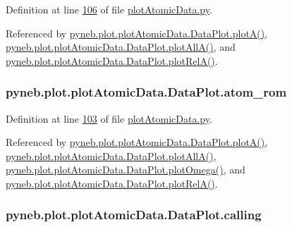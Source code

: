Definition at line \hyperlink{plot_atomic_data_8py_source_l00106}{106} of file \hyperlink{plot_atomic_data_8py_source}{plot\-Atomic\-Data.\-py}.



Referenced by \hyperlink{plot_atomic_data_8py_source_l00117}{pyneb.\-plot.\-plot\-Atomic\-Data.\-Data\-Plot.\-plot\-A()}, \hyperlink{plot_atomic_data_8py_source_l00189}{pyneb.\-plot.\-plot\-Atomic\-Data.\-Data\-Plot.\-plot\-All\-A()}, and \hyperlink{plot_atomic_data_8py_source_l00262}{pyneb.\-plot.\-plot\-Atomic\-Data.\-Data\-Plot.\-plot\-Rel\-A()}.

\hypertarget{classpyneb_1_1plot_1_1plot_atomic_data_1_1_data_plot_a334c448311ed9dc8cd700af504e06254}{
\subsubsection[{atom\-\_\-rom}]{\setlength{\rightskip}{0pt plus 5cm}pyneb.\-plot.\-plot\-Atomic\-Data.\-Data\-Plot.\-atom\-\_\-rom}}\label{classpyneb_1_1plot_1_1plot_atomic_data_1_1_data_plot_a334c448311ed9dc8cd700af504e06254}


Definition at line \hyperlink{plot_atomic_data_8py_source_l00103}{103} of file \hyperlink{plot_atomic_data_8py_source}{plot\-Atomic\-Data.\-py}.



Referenced by \hyperlink{plot_atomic_data_8py_source_l00117}{pyneb.\-plot.\-plot\-Atomic\-Data.\-Data\-Plot.\-plot\-A()}, \hyperlink{plot_atomic_data_8py_source_l00189}{pyneb.\-plot.\-plot\-Atomic\-Data.\-Data\-Plot.\-plot\-All\-A()}, \hyperlink{plot_atomic_data_8py_source_l00373}{pyneb.\-plot.\-plot\-Atomic\-Data.\-Data\-Plot.\-plot\-Omega()}, and \hyperlink{plot_atomic_data_8py_source_l00262}{pyneb.\-plot.\-plot\-Atomic\-Data.\-Data\-Plot.\-plot\-Rel\-A()}.

\hypertarget{classpyneb_1_1plot_1_1plot_atomic_data_1_1_data_plot_a393a133b607541c57d5ebc5a34687e3f}{
\subsubsection[{calling}]{\setlength{\rightskip}{0pt plus 5cm}pyneb.\-plot.\-plot\-Atomic\-Data.\-Data\-Plot.\-calling}}\label{classpyneb_1_1plot_1_1plot_atomic_data_1_1_data_plot_a393a133b607541c57d5ebc5a34687e3f}


